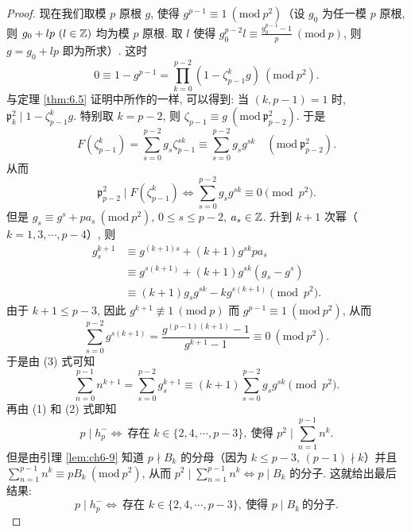\begin{proof}
现在我们取模 $p$ 原根 $g$, 使得 $g^{p-1}\equiv 1\ (\mathrm{mod}\ p^2)$（设 $g_0$ 为任一模 $p$ 原根, 则 $g_0+lp\ (l\in\mathbb{Z})$ 均为模 $p$ 原根. 取 $l$ 使得 $g_0^{p-2}l\equiv\frac{g_0^{p-1}-1}{p}\ (\mathrm{mod}\ p)$, 则 $g=g_0+lp$ 即为所求）. 这时
\[
  0\equiv 1-g^{p-1}=\prod_{k=0}^{p-2}(1-\zeta_{p-1}^kg)\ (\mathrm{mod}\ p^2).
\]
与定理 \ref{thm:6.5} 证明中所作的一样, 可以得到: 当 $(k,p-1)=1$ 时, $\mathfrak{p}_k^2\mid 1-\zeta_{p-1}^kg$. 特别取 $k=p-2$, 则 $\zeta_{p-1}\equiv g\ (\mathrm{mod}\ \mathfrak{p}_{p-2}^2)$. 于是
\[
  F(\zeta_{p-1}^k)=\sum_{s=0}^{p-2}g_s\zeta_{p-1}^{sk}\equiv\sum_{s=0}^{p-2}g_sg^{sk}\quad(\mathrm{mod}\ \mathfrak{p}_{p-2}^2).
\]
从而
\begin{equation}\tag{2}
  \mathfrak{p}_{p-2}^2\mid F(\zeta_{p-1}^k)\Leftrightarrow\sum_{s=0}^{p-2}g_sg^{sk}\equiv 0\pmod{p^2}.
\end{equation}
但是 $g_s\equiv g^s+pa_s\ (\mathrm{mod}\ p^2)$, $0\leqslant s\leqslant p-2$, $a_s\in\mathbb{Z}$. 升到 $k+1$ 次幂（$k=1,3,\cdots,p-4$）, 则
\begin{align*}
  g_s^{k+1}&\equiv g^{(k+1)s}+(k+1)g^{sk}pa_s\\
  &\equiv g^{s(k+1)}+(k+1)g^{sk}(g_s-g^s)\\
  &\equiv(k+1)g_sg^{sk}-kg^{s(k+1)}\pmod{p^2}.\tag{3}
\end{align*}
由于 $k+1\leqslant p-3$, 因此 $g^{k+1}\not\equiv 1\ (\mathrm{mod}\ p)$ 而 $g^{p-1}\equiv 1\ (\mathrm{mod}\ p^2)$, 从而
\[
  \sum_{s=0}^{p-2}g^{s(k+1)}=\frac{g^{(p-1)(k+1)}-1}{g^{k+1}-1}\equiv 0\ (\mathrm{mod}\ p^2).
\]
于是由 (3) 式可知
\[
  \sum_{n=0}^{p-1}n^{k+1}=\sum_{s=0}^{p-2}g_s^{k+1}\equiv(k+1)\sum_{s=0}^{p-2}g_sg^{sk}\pmod{p^2}.
\]
再由 (1) 和 (2) 式即知
\[
  p\mid h_p^-\Leftrightarrow\ \text{存在 } k\in\{2,4,\cdots,p-3\},\ \text{使得 } p^2\mid\sum_{n=1}^{p-1}n^k.
\]
但是由引理 \ref{lem:ch6-9} 知道 $p\nmid B_k$ 的分母（因为 $k\leqslant p-3$, $(p-1)\nmid k$）并且 $\sum_{n=1}^{p-1}n^k\equiv pB_k\ (\mathrm{mod}\ p^2)$, 从而 $p^2\mid\sum_{n=1}^{p-1}n^k\Leftrightarrow p\mid B_k$ 的分子. 这就给出最后结果:
\[
  p\mid h_p^-\Leftrightarrow\ \text{存在 } k\in\{2,4,\cdots,p-3\},\ \text{使得 } p\mid B_k\ \text{的分子}.
\]
\end{proof}

